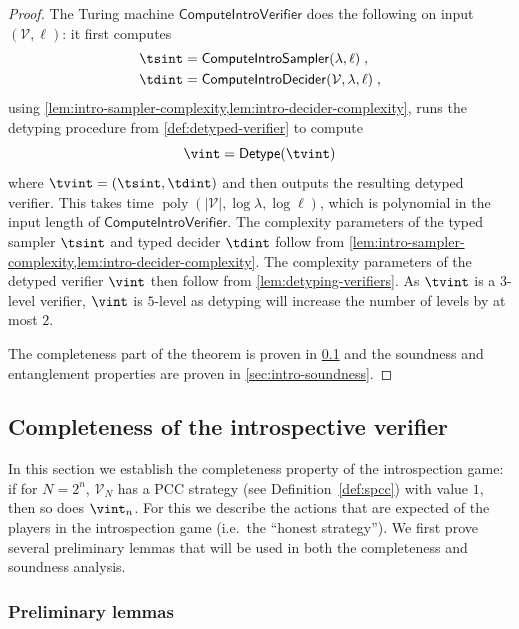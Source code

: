 \documentclass[11pt]{article}
\theoremstyle{definition}
\DeclareMathOperator{\poly}{poly}
\newcommand{\abs}[1]{\left\vert {#1} \right\vert}
\newcommand{\verifier}{\mathcal{V}}
\newcommand{\tmstyle}[1]{\ensuremath{\mathsf{#1}}}
\newcommand{\ComputeIntroSampler}{\tmstyle{ComputeIntroSampler}}
\newcommand{\ComputeIntroDecider}{\tmstyle{ComputeIntroDecider}}
\newcommand{\ComputeIntroVerifier}{\tmstyle{ComputeIntroVerifier}}
\newcommand{\detype}{\tmstyle{Detype}}
\begin{document}
\begin{proof}
  The Turing machine $\ComputeIntroVerifier$ does the following on input
  $(\verifier, \ell)$: it first computes
  \begin{align*}
    \tsint & = \ComputeIntroSampler(\lambda,\ell)\;,\\
    \tdint & = \ComputeIntroDecider(\verifier, \lambda, \ell)\;,
  \end{align*}
  using \cref{lem:intro-sampler-complexity,lem:intro-decider-complexity}, runs
  the detyping procedure from \cref{def:detyped-verifier} to compute
  \begin{equation*}
    \vint = \detype(\tvint)
  \end{equation*}
  where $\tvint = (\tsint,\tdint)$ and then outputs the resulting detyped verifier.
  This takes time $\poly(\abs{\verifier}, \log\lambda, \log\ell)$, which is polynomial
  in the input length of $\ComputeIntroVerifier$. 
  The complexity parameters of the typed sampler $\tsint$ and typed decider
  $\tdint$ follow from
  \cref{lem:intro-sampler-complexity,lem:intro-decider-complexity}.
  The complexity parameters of the detyped verifier $\vint$ then follow from
  \cref{lem:detyping-verifiers}.
  As $\tvint$ is a $3$-level verifier, $\vint$ is $5$-level as detyping will
  increase the number of levels by at most $2$.

  The completeness part of the theorem is proven in \cref{sec:intro-completeness} and
  the soundness and entanglement properties are proven in \cref{sec:intro-soundness}.
\end{proof}


\subsection{Completeness of the introspective verifier}
\label{sec:intro-completeness}

In this section we establish the completeness property of the introspection
game: if for $N = 2^n$, $\verifier_N$ has a PCC strategy (see
Definition~\ref{def:spcc}) with value $1$, then so does $\vint_n$.
For this we describe the actions that are expected of the players in the
introspection game (i.e.\ the ``honest strategy'').
We first prove several preliminary lemmas that will be used in both the
completeness and soundness analysis.

\subsubsection{Preliminary lemmas}
\end{document}
